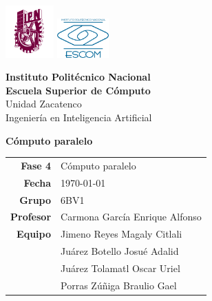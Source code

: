 \begin{titlepage}
	\centering
	\includegraphics[height=2cm]{logo/Logo_IPN.png}
	\hfill
	\raisebox{0.25\height}
	{\includegraphics[height=1.5cm]{logo/escudoESCOM.png}}

	\vspace{-1.5cm}
	\large\textbf{Instituto Politécnico Nacional}\\
	\large\textbf{Escuela Superior de Cómputo}\\
	\large{Unidad Zacatenco}\\
	\vspace{0.5cm}
	\large{{Ingeniería en Inteligencia Artificial}}
	\vspace{2cm}


	\Large{\textbf{Cómputo paralelo}}

	\vspace{8cm}

	\begin{tabular}{rl}
		\textbf{Fase 4}  & Cómputo paralelo
		                   \\
		\textbf{Fecha} & \today \\
		\textbf{Grupo}    & 6BV1                        \\
		\textbf{Profesor} & Carmona García Enrique Alfonso\\
		\textbf{Equipo}   
		& Jimeno Reyes Magaly Citlali \\
		& Juárez Botello Josué Adalid \\
		& Juárez Tolamatl Oscar Uriel \\
		& Porras Zúñiga Braulio Gael \\
	\end{tabular}
\end{titlepage}
